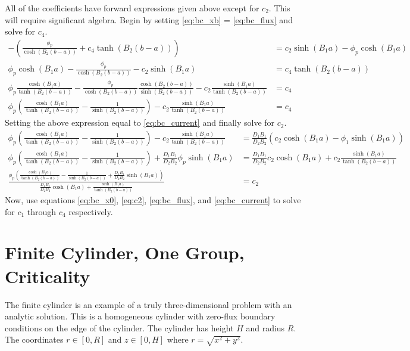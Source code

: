   All of the coefficients have forward expressions given above except for 
  $c_2$. This will require significant algebra. Begin by setting 
  \eqref{eq:bc_xb} = \eqref{eq:bc_flux} and solve for $c_4$.
  \begin{align}
    - \left( \frac{\phi_p}{\cosh(B_2(b-a))} + c_4 \tanh(B_2 (b-a))\right)&=
      c_2 \sinh(B_1 a) - \phi_p \cosh(B_1 a) \\
    \phi_p \cosh(B_1 a) - \frac{\phi_p}{\cosh(B_2(b-a))} - 
      c_2 \sinh(B_1 a) &= c_4 \tanh(B_2 (b-a)) \\
    \phi_p \frac{\cosh(B_1 a)}{\tanh(B_2(b-a))} - 
      \frac{\phi_p}{\cosh(B_2(b-a))} 
      \frac{\cosh(B_2(b-a))}{\sinh(B_2(b-a))} - 
      c_2 \frac{\sinh(B_1 a)}{\tanh(B_2(b-a))} &= c_4\\
    \phi_p \left(\frac{\cosh(B_1 a)}{\tanh(B_2(b-a))} - \frac{1}
      {\sinh(B_2(b-a))} \right) - c_2 \frac{\sinh(B_1a)}{\tanh(B_2(b-a))} 
      &= c_4
  \end{align}
  Setting the above expression equal to \eqref{eq:bc_current} and finally 
  solve for $c_2$.
  \begin{align}
    \phi_p \left(\frac{\cosh(B_1 a)}{\tanh(B_2(b-a))} - 
      \frac{1}{\sinh(B_2(b-a))}\right) -
      c_2 \frac{\sinh(B_1 a)}{\tanh(B_2(b-a))} &=
      \frac{D_1 B_1}{D_2 B_2} \left( c_2 \cosh(B_1 a) - 
      \phi_1 \sinh(B_1 a)\right) \\
    \phi_p \left(\frac{\cosh(B_1 a)}{\tanh(B_2(b-a))} - 
      \frac{1}{\sinh(B_2(b-a))} \right) + 
      \frac{D_1 B_1}{D_2 B_2} \phi_p \sinh(B_1 a) &= 
      \frac{D_1 B_1}{D_2 B_2} c_2 \cosh(B_1a) + 
      c_2 \frac{\sinh(B_1a)}{\tanh(B_2(b-a))} \\
    \frac{\phi_p \left( \frac{\cosh(B_1a)}{\tanh(B_2(b-a))} - 
      \frac{1}{\sinh(B_2(b-a))} + 
      \frac{D_1 B_1}{D_2B_2} \sinh(B_1a) \right)}
      {\frac{D_1B_1}{D_2B_2} \cosh(B_1a) + 
      \frac{\sinh(B_1a)}{\tanh(B_2(b-a))}} &= c_2 \label{eq:c2}
  \end{align}
  Now, use equations \eqref{eq:bc_x0}, \eqref{eq:c2}, \eqref{eq:bc_flux}, and 
  \eqref{eq:bc_current} to solve for $c_1$ through $c_4$ respectively.
  
\section{Finite Cylinder, One Group, Criticality}
  The finite cylinder is an example of a truly three-dimensional problem with
  an analytic solution. This is a homogeneous cylinder with zero-flux boundary
  conditions on the edge of the cylinder. The cylinder has height $H$ and 
  radius $R$. The coordinates $r\in[0,R]$ and $z\in[0,H]$ where 
  $r=\sqrt{x^2+y^2}$.
  
